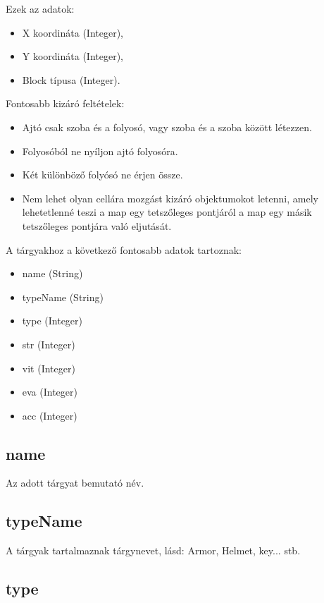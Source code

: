 \noindent Ezek az adatok:

\begin{itemize}
    \item X koordináta (Integer),
    \item Y koordináta (Integer),
    \item Block típusa (Integer).
\end{itemize}

\noindent Fontosabb kizáró feltételek:

\begin{itemize}
    \item Ajtó csak szoba és a folyosó, vagy szoba és a szoba között létezzen.
    \item Folyosóból ne nyíljon ajtó folyosóra.
    \item Két különböző folyósó ne érjen össze.
    \item Nem lehet olyan cellára mozgást kizáró objektumokot letenni, amely lehetetlenné teszi a map egy tetszőleges pontjáról a map egy másik tetszőleges pontjára való eljutását.
\end{itemize}


A tárgyakhoz a következő fontosabb adatok tartoznak:
\begin{itemize}
    \item name (String)
    \item typeName (String)
    \item type (Integer)
    \item str (Integer)
    \item vit (Integer)
    \item eva (Integer)
    \item acc (Integer)
\end{itemize}

\subsection{name}

Az adott tárgyat bemutató név.

\subsection{typeName}

A tárgyak tartalmaznak tárgynevet, lásd: Armor, Helmet, key... stb.

\subsection{type}

